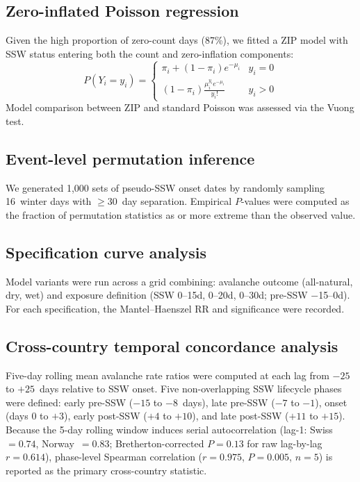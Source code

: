 \documentclass[11pt,letterpaper]{article}
\begin{document}
\subsection{Zero-inflated Poisson regression}

Given the high proportion of zero-count days (87\%), we fitted a ZIP model with SSW status entering both the count and zero-inflation components:
\[
P(Y_i = y_i) = \begin{cases}
\pi_i + (1 - \pi_i) e^{-\mu_i} & y_i = 0 \\
(1 - \pi_i) \frac{\mu_i^{y_i} e^{-\mu_i}}{y_i!} & y_i > 0
\end{cases}
\]
Model comparison between ZIP and standard Poisson was assessed via the Vuong test.

\subsection{Event-level permutation inference}

We generated 1,000 sets of pseudo-SSW onset dates by randomly sampling 16~winter days with $\geq 30$~day separation. Empirical $P$-values were computed as the fraction of permutation statistics as or more extreme than the observed value.

\subsection{Specification curve analysis}

Model variants were run across a grid combining: avalanche outcome (all-natural, dry, wet) and exposure definition (SSW 0--15d, 0--20d, 0--30d; pre-SSW $-$15--0d). For each specification, the Mantel--Haenszel RR and significance were recorded.

\subsection{Cross-country temporal concordance analysis}

Five-day rolling mean avalanche rate ratios were computed at each lag from $-25$ to $+25$~days relative to SSW onset. Five non-overlapping SSW lifecycle phases were defined: early pre-SSW ($-15$ to $-8$~days), late pre-SSW ($-7$ to $-1$), onset (days $0$ to $+3$), early post-SSW ($+4$ to $+10$), and late post-SSW ($+11$ to $+15$). Because the 5-day rolling window induces serial autocorrelation (lag-1: Swiss~$= 0.74$, Norway~$= 0.83$; Bretherton-corrected $P = 0.13$ for raw lag-by-lag $r = 0.614$), phase-level Spearman correlation ($r = 0.975$, $P = 0.005$, $n = 5$) is reported as the primary cross-country statistic.
\end{document}
